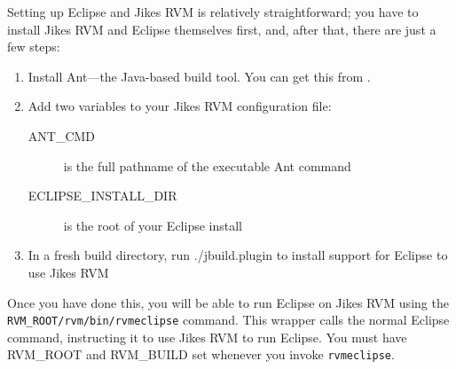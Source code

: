  Setting up Eclipse and Jikes RVM is relatively straightforward; you
have to install Jikes RVM and Eclipse themselves first, and, after
that, there are just a few steps:
\begin{enumerate}
\item Install Ant---the Java-based build tool.  You can get this from
\xlink{{\tt \antURL}}{\antURL}. 
\item Add two variables to your Jikes RVM configuration file:
 \begin{description}
 \item[ANT\_CMD] is the full pathname of the executable Ant command
 \item[ECLIPSE\_INSTALL\_DIR] is the root of your Eclipse install
 \end{description}
\item In a fresh build directory, run ./jbuild.plugin to install
support for Eclipse to use Jikes RVM
\end{enumerate}

 Once you have done this, you will be able to run Eclipse on Jikes RVM
using the {\tt RVM\_ROOT/rvm/bin/rvmeclipse} command.  This wrapper
calls the normal Eclipse command, instructing it to use Jikes RVM to
run Eclipse.  You must have RVM\_ROOT and RVM\_BUILD set whenever you
invoke {\tt rvmeclipse}.
